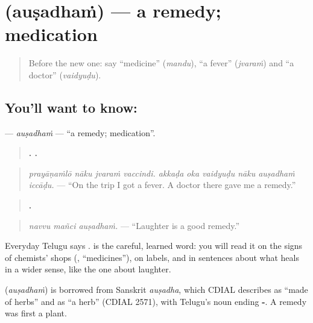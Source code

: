 \section[\texorpdfstring{\te{ఔషధం} (auṣadhaṁ)}{ఔషధం (auṣadhaṁ)}]{ (auṣadhaṁ) — a remedy; medication}

\label{lesson:TE-C321-ausadham}



\begin{quote}
Before the new one: say \textquotedblleft{}medicine\textquotedblright{} (\emph{mandu}), \textquotedblleft{}a fever\textquotedblright{} (\emph{jvaraṁ}) and \textquotedblleft{}a doctor\textquotedblright{} (\emph{vaidyuḍu}).
\end{quote}

\subsection*{You'll want to know: }
\textbf{} — \emph{auṣadhaṁ} — \textquotedblleft{}a remedy; medication\textquotedblright{}.

\begin{quote}
\textbf{   .      .}
\end{quote}

\begin{quote}
\emph{prayāṇaṁlō nāku jvaraṁ vaccindi. akkaḍa oka vaidyuḍu nāku auṣadhaṁ iccāḍu.} — \textquotedblleft{}On the trip I got a fever. A doctor there gave me a remedy.\textquotedblright{}
\end{quote}

\begin{quote}
\textbf{  .}
\end{quote}

\begin{quote}
\emph{navvu mañci auṣadhaṁ.} — \textquotedblleft{}Laughter is a good remedy.\textquotedblright{}
\end{quote}

Everyday Telugu says \textbf{}. \textbf{} is the careful, learned word: you will read it on the signs of chemists' shops (\textbf{}, \textquotedblleft{}medicines\textquotedblright{}), on labels, and in sentences about what heals in a wider sense, like the one about laughter.

\begin{cousinweb}
\textbf{} (\emph{auṣadhaṁ}) is borrowed from Sanskrit \emph{auṣadha}, which CDIAL describes as \textquotedblleft{}made of herbs\textquotedblright{} and as \textquotedblleft{}a herb\textquotedblright{} (CDIAL 2571), with Telugu's noun ending \textbf{-}. A remedy was first a plant.
\end{cousinweb}

